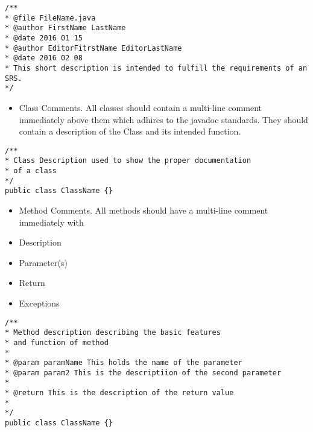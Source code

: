 \documentclass{scrreprt}
\begin{document}
\texttt{/** \\}
\texttt{* @file FileName.java \\}
\texttt{* @author FirstName LastName\\}
\texttt{* @date 2016 01 15 \\}
\texttt{* @author EditorFitrstName EditorLastName\\}
\texttt{* @date 2016 02 08\\}
\texttt{* This short description is intended to fulfill the requirements of an SRS. \\}
\texttt{*/ \\}

\begin{itemize}
\item Class Comments. All classes should contain a multi-line comment immediately above them which adhires to 
the javadoc standards. They should contain a description of the Class and its intended function. \\
\end{itemize}

\texttt{/** \\}
\texttt{* Class Description used to show the proper documentation \\}
\texttt{* of a class \\}
\texttt{*/ \\}
\texttt{public class ClassName \{\}}

\begin{itemize}
\item Method Comments. All methods should have a multi-line comment immediately with
\item Description
\item Parameter(s)
\item Return
\item Exceptions
\end{itemize}

\texttt{/** \\}
\texttt{* Method description describing the basic features \\}
\texttt{* and function of method\\}
\texttt{* \\}
\texttt{* @param paramName This holds the name of the parameter \\}
\texttt{* @param param2 This is the descriptiion of the second parameter \\}
\texttt{* \\}
\texttt{* @return This is the description of the return value\\}
\texttt{* \\}
\texttt{*/ \\}
\texttt{public class ClassName \{\}}
\end{document}
